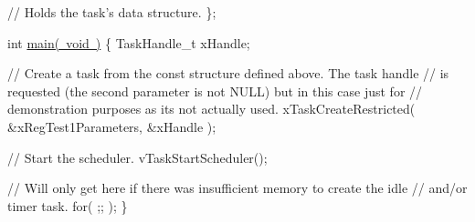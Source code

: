 \begin{DoxyPre}     // Holds the task's data structure.
\};\end{DoxyPre}



\begin{DoxyPre}int \mbox{\hyperlink{main_8c_a840291bc02cba5474a4cb46a9b9566fe}{main( void )}}
\{
TaskHandle\_t xHandle;\end{DoxyPre}



\begin{DoxyPre}    // Create a task from the const structure defined above.  The task handle
    // is requested (the second parameter is not NULL) but in this case just for
    // demonstration purposes as its not actually used.
    xTaskCreateRestricted( \&xRegTest1Parameters, \&xHandle );\end{DoxyPre}



\begin{DoxyPre}    // Start the scheduler.
    vTaskStartScheduler();\end{DoxyPre}



\begin{DoxyPre}    // Will only get here if there was insufficient memory to create the idle
    // and/or timer task.
    for( ;; );
\}
   \end{DoxyPre}
 